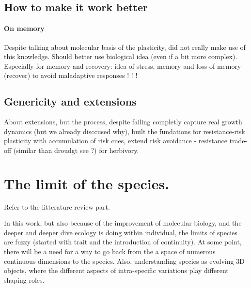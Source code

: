 \subsection{How to make it work better}
\paragraph{On memory}

Despite talking about molecular basis of the plasticity, did not really make use of this knowledge. Should better use biological idea (even if a bit more complex). Especially for memory and recovery: idea of stress, memory and loss of memory (recover) to avoid maladaptive responses \cite{crisp_reconsidering_2016} ! ! ! 


\subsection{Genericity and extensions}

About extensions, but the process, despite failing completly capture real growth dynamics (but we already disccused why), built the fundations for resistance-risk plasticity with accumulation of risk cues, extend risk avoidance - resistance trade-off (similar than droudgt see \cite{kooyers_evolution_2015}?) for herbivory.

\section{The limit of the species.}

Refer to the litterature review part.

In this work, but also because of the improvement of molecular biology, and the deeper and deeper dive ecology is doing within individual, the limits of species are fuzzy (started with trait and the introduction of continuity). At some point, there will be a need for a way to go back from the a space of numerous continuous dimensions to the species. Also, understanding species as evolving 3D objects, where the different aspects of intra-specific variations play different shaping roles.